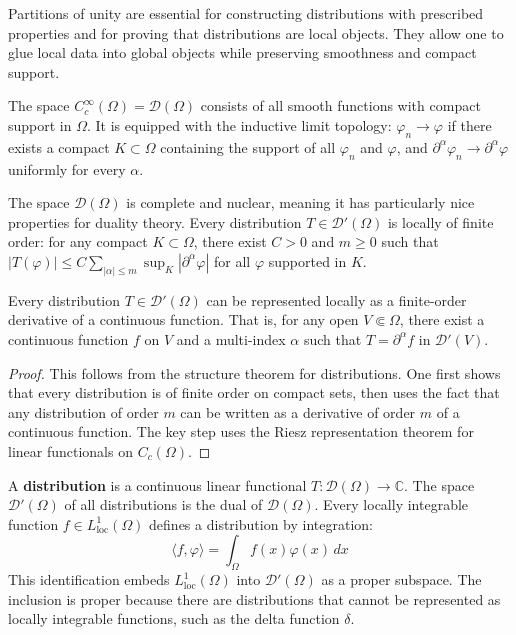 Partitions of unity are essential for constructing distributions with prescribed properties and for proving that distributions are local objects. They allow one to glue local data into global objects while preserving smoothness and compact support.

\begin{definition}
The space $C_c^\infty(\Omega) = \mathcal{D}(\Omega)$ consists of all smooth functions with compact support in $\Omega$. It is equipped with the inductive limit topology: $\varphi_n \to \varphi$ if there exists a compact $K \subset \Omega$ containing the support of all $\varphi_n$ and $\varphi$, and $\partial^\alpha \varphi_n \to \partial^\alpha \varphi$ uniformly for every $\alpha$.
\end{definition}

The space $\mathcal{D}(\Omega)$ is complete and nuclear, meaning it has particularly nice properties for duality theory. Every distribution $T \in \mathcal{D}'(\Omega)$ is locally of finite order: for any compact $K \subset \Omega$, there exist $C > 0$ and $m \geq 0$ such that $|T(\varphi)| \leq C \sum_{|\alpha| \leq m} \sup_K |\partial^\alpha \varphi|$ for all $\varphi$ supported in $K$.

\begin{theorem}
Every distribution $T \in \mathcal{D}'(\Omega)$ can be represented locally as a finite-order derivative of a continuous function. That is, for any open $V \Subset \Omega$, there exist a continuous function $f$ on $V$ and a multi-index $\alpha$ such that $T = \partial^\alpha f$ in $\mathcal{D}'(V)$.
\end{theorem}

\begin{proof}
This follows from the structure theorem for distributions. One first shows that every distribution is of finite order on compact sets, then uses the fact that any distribution of order $m$ can be written as a derivative of order $m$ of a continuous function. The key step uses the Riesz representation theorem for linear functionals on $C_c(\Omega)$.
\end{proof}

A \textbf{distribution} is a continuous linear functional $T: \mathcal{D}(\Omega) \to \mathbb{C}$. The space $\mathcal{D}'(\Omega)$ of all distributions is the dual of $\mathcal{D}(\Omega)$. Every locally integrable function $f \in L^1_{\text{loc}}(\Omega)$ defines a distribution by integration:
\[\langle f, \varphi \rangle = \int_\Omega f(x) \varphi(x) \, dx\]
This identification embeds $L^1_{\text{loc}}(\Omega)$ into $\mathcal{D}'(\Omega)$ as a proper subspace. The inclusion is proper because there are distributions that cannot be represented as locally integrable functions, such as the delta function $\delta$.

